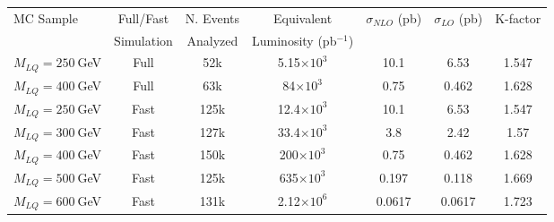 \begin{table}[htb]
  \label{tab:NumEvents}
  \begin{center}
    \begin{tabular}{|l|cccccc|} \hline\hline
      MC Sample                   & Full/Fast & N. Events & Equivalent             & $\sigma_{NLO}$ (pb) & $\sigma_{LO}$ (pb) & K-factor \\
                                  & Simulation& Analyzed  & Luminosity (pb$^{-1}$)   &                     &                    &    \\ 
\hline\hline
      $M_{LQ}=250~$GeV            & Full      & 52k       &    5.15$\times 10^3$   & 10.1                & 6.53               & 1.547\\
      $M_{LQ}=400~$GeV            & Full      & 63k       &      84$\times 10^3$   &  0.75		 & 0.462	      & 1.628\\ 
\hline
      $M_{LQ}=250~$GeV            & Fast      & 125k      &    12.4$\times 10^3$   & 10.1		 & 6.53		      & 1.547\\
      $M_{LQ}=300~$GeV            & Fast      & 127k      &    33.4$\times 10^3$   &  3.8	         & 2.42		      & 1.57\\
      $M_{LQ}=400~$GeV            & Fast      & 150k      &     200$\times 10^3$   &  0.75	         & 0.462	      & 1.628\\
      $M_{LQ}=500~$GeV            & Fast      & 125k      &     635$\times 10^3$   &  0.197  	         & 0.118	      & 1.669\\
      $M_{LQ}=600~$GeV            & Fast      & 131k      &    2.12$\times 10^6$   &  0.0617             & 0.0617             & 1.723\\

\end{tabular}
\end{center}
\end{table}
